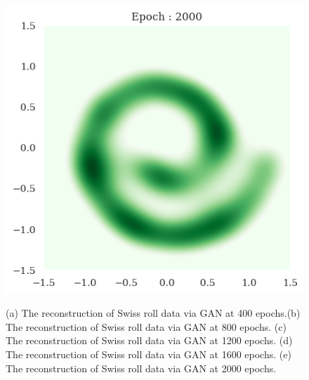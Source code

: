 \documentclass[10pt]{article}
\begin{document}
\begin{figure}[!h]
\begin{center}
{            \includegraphics[scale = 0.2]{fig3-5.png}
        }
        \caption{(a) The reconstruction of Swiss roll data via GAN at 400 epochs.(b) The reconstruction of Swiss roll data via GAN at 800 epochs. (c) The reconstruction of Swiss roll data via GAN at 1200 epochs. (d) The reconstruction of Swiss roll data via GAN at 1600 epochs. (e) The reconstruction of Swiss roll data via GAN at 2000 epochs.}
        \label{fig3}
    \end{center}
\end{figure}
\end{document}
